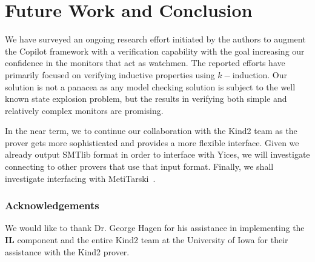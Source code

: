 \section{Future Work and Conclusion}\label{sec:conclusion}
We have surveyed an ongoing research effort initiated by the authors
to augment the  Copilot framework
with a  verification capability  with the  goal  increasing our confidence in
the monitors that act as watchmen.  The reported efforts have
primarily focused on verifying inductive properties using
$k-$induction. Our solution is not a panacea as any model checking
solution is subject to the well known state explosion problem, but 
the results in verifying both simple and relatively complex monitors
are promising. 

 In the near term, we to continue our collaboration with the Kind2
 team as the prover gets more sophisticated and provides a more
 flexible interface. Given we already output SMTlib format in order to
 interface with Yices, we will investigate connecting to other provers
 that use that input format. Finally, we shall investigate interfacing
 with MetiTarski~\cite{AkbarpourPaulson}.


\subsubsection{Acknowledgements} We would like to thank Dr. George Hagen
for his assistance in implementing the {\bf IL} component and the
entire Kind2 team at the University of Iowa for their assistance with
the Kind2 prover. 

